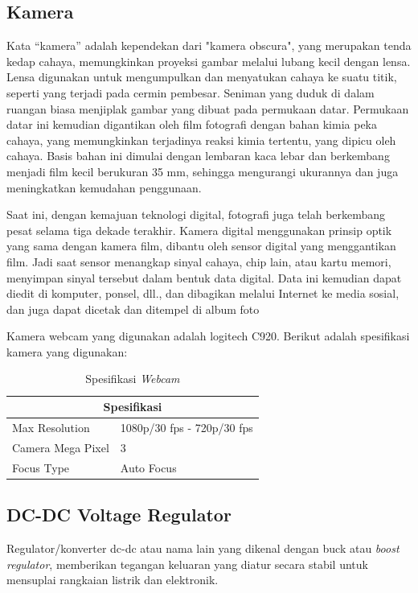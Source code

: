 \subsection{Kamera}
Kata “kamera” adalah kependekan dari "kamera obscura", yang merupakan tenda kedap cahaya, memungkinkan proyeksi gambar melalui lubang kecil dengan lensa. Lensa digunakan untuk mengumpulkan dan menyatukan cahaya ke suatu titik, seperti yang terjadi pada cermin pembesar. Seniman yang duduk di dalam ruangan biasa menjiplak gambar yang dibuat pada permukaan datar. Permukaan datar ini kemudian digantikan oleh film fotografi dengan bahan kimia peka cahaya, yang memungkinkan terjadinya reaksi kimia tertentu, yang dipicu oleh cahaya. Basis bahan ini dimulai dengan lembaran kaca lebar dan berkembang menjadi film kecil berukuran 35 mm, sehingga mengurangi ukurannya dan juga meningkatkan kemudahan penggunaan.

Saat ini, dengan kemajuan teknologi digital, fotografi juga telah berkembang pesat selama tiga dekade terakhir. Kamera digital menggunakan prinsip optik yang sama dengan kamera film, dibantu oleh sensor digital yang menggantikan film. Jadi saat sensor menangkap sinyal cahaya, chip lain, atau kartu memori, menyimpan sinyal tersebut dalam bentuk data digital. Data ini kemudian dapat diedit di komputer, ponsel, dll., dan dibagikan melalui Internet ke media sosial, dan juga dapat dicetak dan ditempel di album foto \parencite{inbook}

Kamera webcam yang digunakan adalah logitech C920. Berikut adalah spesifikasi kamera yang digunakan:
\begin{table}[H]
\centering
\begin{tabular}{|l|l|}
\hline
\multicolumn{2}{|c|}{\textbf{Spesifikasi}} \\ \hline
Max Resolution & 1080p/30 fps - 720p/30 fps \\ \hline
Camera Mega Pixel & 3 \\ \hline
Focus Type & Auto Focus \\ \hline
\end{tabular}
\caption{Spesifikasi \emph{Webcam}}
\label{tab:my_label}
\end{table}

\subsection{DC-DC Voltage Regulator}
Regulator/konverter dc-dc atau nama lain yang dikenal dengan buck atau \emph{boost regulator}, memberikan tegangan keluaran yang diatur secara stabil untuk mensuplai rangkaian listrik dan elektronik.

